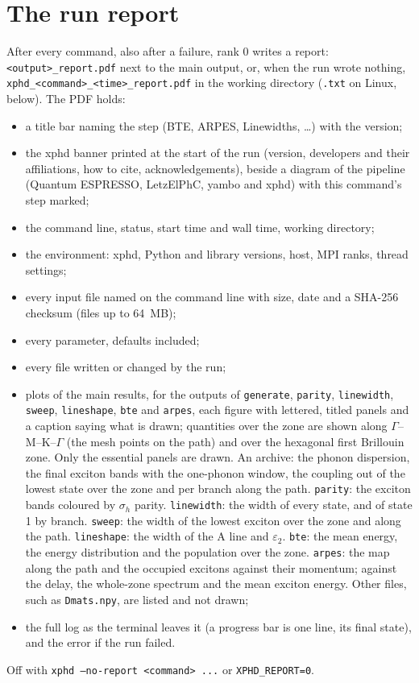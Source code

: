 \documentclass[10pt,a4paper]{article}
\begin{document}
\section{The run report}\label{sec:report}
After every command, also after a failure, rank 0 writes a report: \texttt{<output>\_report.pdf} next to the main
output, or, when the run wrote nothing, \texttt{xphd\_<command>\_<time>\_report.pdf} in the working directory (\texttt{.txt}
on Linux, below). The PDF holds:
\begin{itemize}[nosep,leftmargin=1.4em]
\item a title bar naming the step (BTE, ARPES, Linewidths, \ldots) with the version;
\item the xphd banner printed at the start of the run (version, developers and their affiliations, how to cite,
acknowledgements), beside a diagram of the pipeline (Quantum ESPRESSO, LetzElPhC, yambo and xphd) with this command's step marked;
\item the command line, status, start time and wall time, working directory;
\item the environment: xphd, Python and library versions, host, MPI ranks, thread settings;
\item every input file named on the command line with size, date and a SHA-256 checksum (files up to 64~MB);
\item every parameter, defaults included;
\item every file written or changed by the run;
\item plots of the main results, for the outputs of \texttt{generate}, \texttt{parity}, \texttt{linewidth}, \texttt{sweep},
\texttt{lineshape}, \texttt{bte} and \texttt{arpes}, each figure with lettered, titled panels and a caption saying what is
drawn; quantities over the zone are shown along $\Gamma$--M--K--$\Gamma$ (the mesh points on the path) and over the hexagonal first
Brillouin zone. Only the essential panels are drawn. An archive: the phonon dispersion, the final exciton bands with the one-phonon
window, the coupling out of the lowest state over the zone and per branch along the path. \texttt{parity}: the exciton bands coloured
by $\sigma_h$ parity. \texttt{linewidth}: the width of every state, and of state 1 by branch. \texttt{sweep}: the width of the lowest
exciton over the zone and along the path. \texttt{lineshape}: the width of the A line and $\varepsilon_2$. \texttt{bte}: the mean energy,
the energy distribution and the population over the zone. \texttt{arpes}: the map along the path and the occupied excitons
against their momentum; against the delay, the whole-zone spectrum and the mean exciton energy. Other files, such as
\texttt{Dmats.npy}, are listed and not drawn;
\item the full log as the terminal leaves it (a progress bar is one line, its final state), and the error if the run failed.
\end{itemize}
Off with \texttt{xphd --no-report <command> ...} or \texttt{XPHD\_REPORT=0}.
\end{document}

